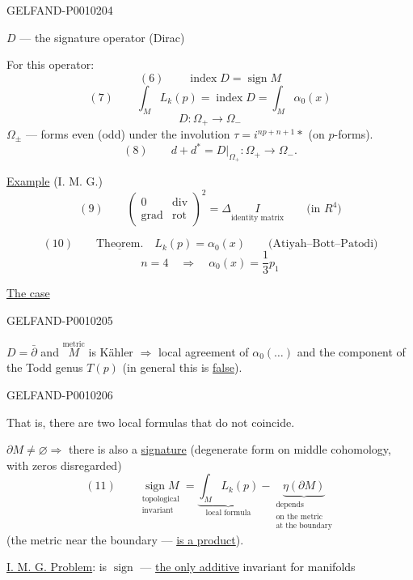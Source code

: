 \begin{GelfandAdjacentEvidence}{GELFAND-P001020}{4}


$D$ --- the signature operator (Dirac)

For this operator:
\[
(6)\qquad \operatorname{index}D=\operatorname{sign}M
\]
\[
(7)\qquad \int_M L_k(p)=\operatorname{index}D=\int_M\alpha_0(x)
\]
\[
D:\Omega_+\longrightarrow\Omega_-
\]
$\Omega_\pm$ --- forms even (odd) under the involution
$\tau=i^{np+n+1}*$ (on $p$-forms).
\[
(8)\qquad d+d^*=D|_{\Omega_+}:\Omega_+\longrightarrow\Omega_-.
\]

\underline{Example} (I. M. G.)
\[
(9)\qquad
\begin{pmatrix}0&\operatorname{div}\\\operatorname{grad}&\operatorname{rot}\end{pmatrix}^{2}
=\Delta\underset{\text{identity matrix}}{I}\qquad\text{(in }R^4\text{)}
\]

\[
(10)\qquad \underline{\text{Theorem.}}\quad L_k(p)=\alpha_0(x)
\qquad\text{(Atiyah--Bott--Patodi)}
\]
\[
n=4\quad\Rightarrow\quad\alpha_0(x)=\frac13p_1
\]

\underline{The case}
\end{GelfandAdjacentEvidence}
\begin{GelfandAdjacentEvidence}{GELFAND-P001020}{5}

\underline{$D=\bar\partial$} and $\overset{\text{metric}}{M}$ is
Kähler
$\Rightarrow$ local agreement of $\alpha_0(\ldots)$ and the component
of the Todd genus $T(p)$ (in general this is \underline{false}).
\end{GelfandAdjacentEvidence}
\begin{GelfandAdjacentEvidence}{GELFAND-P001020}{6}


That is, there are two local formulas that do not coincide.

$\partial M\ne\varnothing\Rightarrow$ there is also a \underline{signature}
(degenerate form on middle cohomology, with zeros disregarded)
\[
(11)\qquad
\underset{\substack{\text{topological}\\\text{invariant}}}{\operatorname{sign}M}
=\underbrace{\int_M L_k(p)}_{\text{local formula}}
-\underbrace{\eta(\partial M)}_{\substack{\text{depends}\\\text{on the metric}\\\text{at the boundary}}}
\]
(the metric near the boundary --- \underline{is a product}).

\underline{I. M. G. Problem}: is $\operatorname{sign}$ ---
\underline{the only additive} invariant for manifolds
\end{GelfandAdjacentEvidence}
